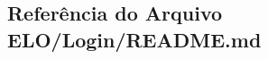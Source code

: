 \hypertarget{ELO_2Login_2README_8md}{\subsection{Referência do Arquivo E\-L\-O/\-Login/\-R\-E\-A\-D\-M\-E.md}
\label{ELO_2Login_2README_8md}
}
